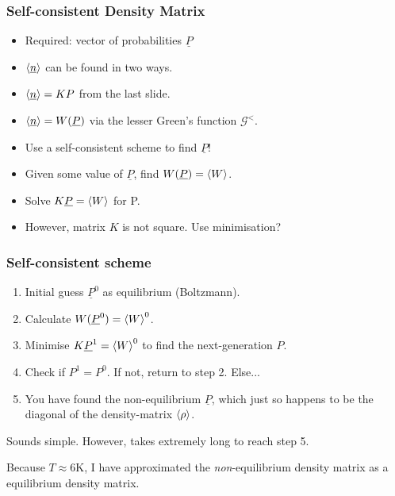 \begin{frame}
    \frametitle{Self-consistent Density Matrix}
    \begin{itemize} 
    \item Required: vector of probabilities $\underline{P}$
    \item $\braket{\underline{n}}$ can be found in two ways.
    \item $\braket{\underline{n}} = K P$ from the last slide.
    \item $\braket{\underline{n}} = W(\underline{P})$ via the lesser Green's function $\mathscr{G}^<$. 
    \item Use a self-consistent scheme to find $\underline{P}$!
    \item Given some value of $\underline{P}$, find $W(\underline{P}) = \braket{W}$.
    \item Solve $ K \underline{P} = \braket{W}$ for P.
    \item However, matrix $K$ is not square. Use minimisation?
    \end{itemize} 
\end{frame}%
\begin{frame}
    \frametitle{Self-consistent scheme}
    \begin{enumerate} 
    \item Initial guess $\underline{P}^0$ as equilibrium (Boltzmann).
    \item Calculate $W(\underline{P}^0) = \braket{W}^0$.
    \item Minimise $K \underline{P}^1 = \braket{W}^0$ to find the next-generation $P$.
    \item Check if $P^1 = P^0$. If not, return to step 2. Else...
    \item You have found the non-equilibrium $\underline{P}$, which just so happens to be the diagonal of the density-matrix $\braket{\rho}$.
    \end{enumerate} 
    
    Sounds simple. However, takes extremely long to reach step 5. 
    
    Because $T\approx 6$K, I have approximated the \emph{non}-equilibrium density matrix as a equilibrium density matrix. 
\end{frame}%
